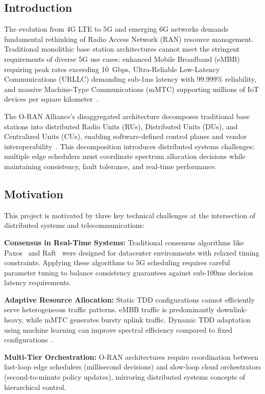 \documentclass[journal]{IEEEtran}
\begin{document}
\subsection{Introduction}

The evolution from 4G LTE to 5G and emerging 6G networks demands fundamental rethinking of Radio Access Network (RAN) resource management. Traditional monolithic base station architectures cannot meet the stringent requirements of diverse 5G use cases: enhanced Mobile Broadband (eMBB) requiring peak rates exceeding 10~Gbps, Ultra-Reliable Low-Latency Communications (URLLC) demanding sub-1ms latency with 99.999\% reliability, and massive Machine-Type Communications (mMTC) supporting millions of IoT devices per square kilometer~\cite{3gpp2018nr}.

The O-RAN Alliance's disaggregated architecture decomposes traditional base stations into distributed Radio Units (RUs), Distributed Units (DUs), and Centralized Units (CUs), enabling software-defined control planes and vendor interoperability~\cite{oran2020architecture}. This decomposition introduces distributed systems challenges: multiple edge schedulers must coordinate spectrum allocation decisions while maintaining consistency, fault tolerance, and real-time performance.

\subsection{Motivation}

This project is motivated by three key technical challenges at the intersection of distributed systems and telecommunications:

\textbf{Consensus in Real-Time Systems:} Traditional consensus algorithms like Paxos~\cite{lamport1998paxos} and Raft~\cite{raft2014} were designed for datacenter environments with relaxed timing constraints. Applying these algorithms to 5G scheduling requires careful parameter tuning to balance consistency guarantees against sub-100ms decision latency requirements.

\textbf{Adaptive Resource Allocation:} Static TDD configurations cannot efficiently serve heterogeneous traffic patterns. eMBB traffic is predominantly downlink-heavy, while mMTC generates bursty uplink traffic. Dynamic TDD adaptation using machine learning can improve spectral efficiency compared to fixed configurations~\cite{ddpg2016}.

\textbf{Multi-Tier Orchestration:} O-RAN architectures require coordination between fast-loop edge schedulers (millisecond decisions) and slow-loop cloud orchestrators (second-to-minute policy updates), mirroring distributed systems concepts of hierarchical control.
\end{document}
